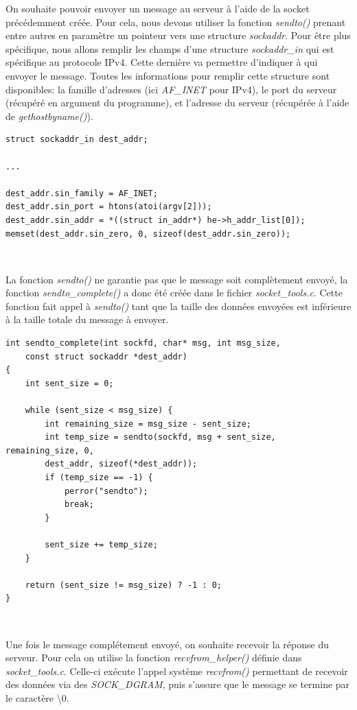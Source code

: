 On souhaite pouvoir envoyer un message au serveur à l'aide de la socket précédemment créée. Pour cela, nous devons utiliser la fonction \emph{sendto()} prenant entre autres en paramètre un pointeur vers une structure \emph{sockaddr}. Pour être plus spécifique, nous allons remplir les champs d'une structure \emph{sockaddr\_in} qui est spécifique au protocole IPv4. Cette dernière va permettre d'indiquer à qui envoyer le message. Toutes les informations pour remplir cette structure sont disponibles: la famille d'adresses (ici \emph{AF\_INET} pour IPv4), le port du serveur (récupéré en argument du programme), et l'adresse du serveur (récupérée à l'aide de \emph{gethostbyname()}).

\begin{lstlisting}
struct sockaddr_in dest_addr;

...

dest_addr.sin_family = AF_INET;
dest_addr.sin_port = htons(atoi(argv[2]));
dest_addr.sin_addr = *((struct in_addr*) he->h_addr_list[0]);
memset(dest_addr.sin_zero, 0, sizeof(dest_addr.sin_zero));
\end{lstlisting}
\

La fonction \emph{sendto()} ne garantie pas que le message soit complètement envoyé, la fonction \emph{sendto\_complete()} a donc été créée dans le fichier \emph{socket\_tools.c}. Cette fonction fait appel à \emph{sendto()} tant que la taille des données envoyées est inférieure à la taille totale du message à envoyer.

\begin{lstlisting}
int sendto_complete(int sockfd, char* msg, int msg_size,
    const struct sockaddr *dest_addr)
{
    int sent_size = 0;

    while (sent_size < msg_size) {
        int remaining_size = msg_size - sent_size;
        int temp_size = sendto(sockfd, msg + sent_size, remaining_size, 0,
        dest_addr, sizeof(*dest_addr));
        if (temp_size == -1) {
            perror("sendto");
            break;
        }

        sent_size += temp_size;
    }

    return (sent_size != msg_size) ? -1 : 0;
}
\end{lstlisting}
\

Une fois le message complétement envoyé, on souhaite recevoir la réponse du serveur. Pour cela on utilise la fonction \emph{recvfrom\_helper()} définie dans \emph{socket\_tools.c}. Celle-ci exécute l'appel système \emph{recvfrom()} permettant de recevoir des données via des \emph{SOCK\_DGRAM}, puis s'assure que le message se termine par le caractère \textbackslash 0.

